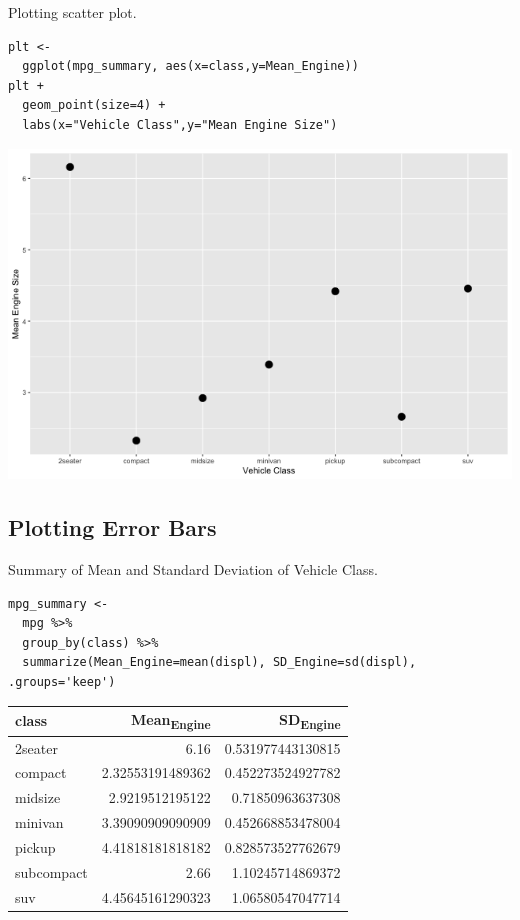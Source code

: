 \documentclass[11pt]{article}
\begin{document}
Plotting scatter plot.

\begin{verbatim}
plt <-
  ggplot(mpg_summary, aes(x=class,y=Mean_Engine))
plt +
  geom_point(size=4) +
  labs(x="Vehicle Class",y="Mean Engine Size")
\end{verbatim}

\begin{org}
\begin{center}
\includegraphics[width=.9\linewidth]{./resources/mpg_layer2.png}
\end{center}
\end{org}

\subsection{Plotting Error Bars}
\label{sec:orgad1a2b4}

Summary of Mean and Standard Deviation of Vehicle Class.

\begin{verbatim}
mpg_summary <-
  mpg %>%
  group_by(class) %>%
  summarize(Mean_Engine=mean(displ), SD_Engine=sd(displ), .groups='keep')
\end{verbatim}

\begin{org}
\begin{center}
\begin{tabular}{lrr}
class & Mean\textsubscript{Engine} & SD\textsubscript{Engine}\\
\hline
2seater & 6.16 & 0.531977443130815\\
compact & 2.32553191489362 & 0.452273524927782\\
midsize & 2.9219512195122 & 0.71850963637308\\
minivan & 3.39090909090909 & 0.452668853478004\\
pickup & 4.41818181818182 & 0.828573527762679\\
subcompact & 2.66 & 1.10245714869372\\
suv & 4.45645161290323 & 1.06580547047714\\
\end{tabular}
\end{center}
\end{org}
\end{document}
